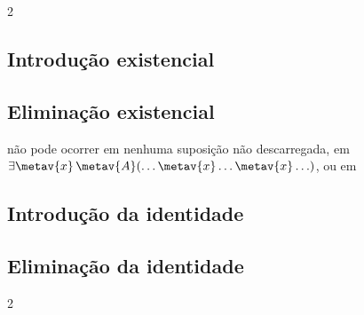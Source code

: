 \begin{multicols}{2}
\subsection*{Introdução existencial}

\begin{fitchproof}
\end{fitchproof}

\vfill\null\columnbreak

\subsection*{Eliminação existencial}

\begin{fitchproof}
	\open
		\AS
	\close
\end{fitchproof}
\begin{raggedright}
\noindent {} não pode ocorrer em nenhuma suposição não descarregada, em $\exists \metav{x}\,\metav{A}(\ldots \metav{x} \ldots \metav{x}\ldots)$, ou em \end{raggedright}
\end{multicols}

\subsection*{Introdução da identidade}

\begin{fitchproof}
	 
\end{fitchproof}


\subsection*{Eliminação da identidade}

\begin{multicols}{2}
\begin{fitchproof}
	 
\end{fitchproof}
\begin{fitchproof}
	 
\end{fitchproof}
\end{multicols}

